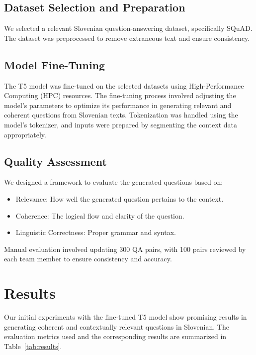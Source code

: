 \documentclass[fleqn,moreauthors,10pt]{ds_report}
\begin{document}
\subsection*{Dataset Selection and Preparation}
We selected a relevant Slovenian question-answering dataset, specifically SQuAD. The dataset was preprocessed to remove extraneous text and ensure consistency.

\subsection*{Model Fine-Tuning}
The T5 model was fine-tuned on the selected datasets using High-Performance Computing (HPC) resources. The fine-tuning process involved adjusting the model’s parameters to optimize its performance in generating relevant and coherent questions from Slovenian texts. Tokenization was handled using the model’s tokenizer, and inputs were prepared by segmenting the context data appropriately.

\subsection*{Quality Assessment}
We designed a framework to evaluate the generated questions based on:
\begin{itemize}[noitemsep]
    \item Relevance: How well the generated question pertains to the context.
    \item Coherence: The logical flow and clarity of the question.
    \item Linguistic Correctness: Proper grammar and syntax.
\end{itemize}

Manual evaluation involved updating 300 QA pairs, with 100 pairs reviewed by each team member to ensure consistency and accuracy.



\section*{Results}
Our initial experiments with the fine-tuned T5 model show promising results in generating coherent and contextually relevant questions in Slovenian. The evaluation metrics used and the corresponding results are summarized in Table~\ref{tab:results}.

\begin{table}[hbt]
	\caption{Evaluation Metrics for Question Generation}
	\centering
	\label{tab:results}
\end{table}
\end{document}
